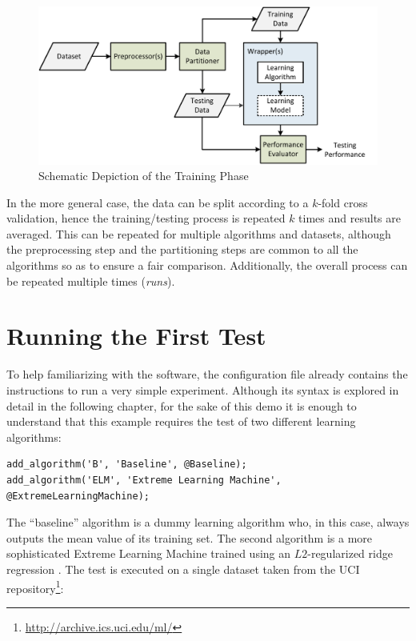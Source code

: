 \begin{figure}
\centering
\includegraphics[scale=0.75]{./images/Disegno3}
\caption{Schematic Depiction of the Training Phase}
\label{fig:trainingphase}
\end{figure}

In the more general case, the data can be split according to a $k$-fold cross validation, hence the training/testing process is repeated $k$ times and results are averaged. This can be repeated for multiple algorithms and datasets, although the preprocessing step and the partitioning steps are common to all the algorithms so as to ensure a fair comparison. Additionally, the overall process can be repeated multiple times (\textit{runs}).

\section{Running the First Test}
\label{sec:runningfirsttest}
To help familiarizing with the software, the configuration file already contains the instructions to run a very simple experiment. 
Although its syntax is explored in detail in the following chapter, for the sake of this demo it is enough to understand that this example requires the test of two different learning algorithms:

\begin{lstlisting}
add_algorithm('B', 'Baseline', @Baseline);
add_algorithm('ELM', 'Extreme Learning Machine', @ExtremeLearningMachine);
\end{lstlisting}

\noindent The ``baseline'' algorithm is a dummy learning algorithm who, in this case, always outputs the mean value of its training set. The second algorithm is a more sophisticated Extreme Learning Machine trained using an $L2$-regularized ridge regression \cite{Huang2012}. The test is executed on a single dataset taken from the UCI repository\footnote{\url{http://archive.ics.uci.edu/ml/}}:

